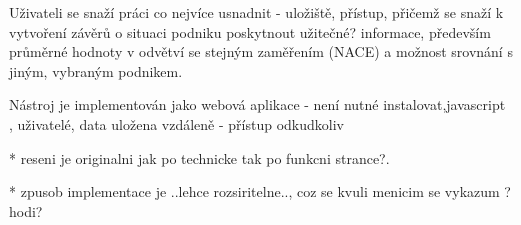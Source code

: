 Uživateli se snaží práci co nejvíce usnadnit - uložiště, přístup, přičemž se snaží k vytvoření závěrů o situaci podniku poskytnout užitečné? informace, především průměrné hodnoty v odvětví se stejným zaměřením (NACE) a možnost srovnání s jiným, vybraným podnikem.

Nástroj je implementován jako webová aplikace - není nutné instalovat,javascript , uživatelé, data uložena vzdáleně - přístup odkudkoliv

* reseni je originalni jak po technicke tak po funkcni strance?. 

* zpusob implementace je ..lehce rozsiritelne.., coz se kvuli menicim se vykazum ?hodi?


